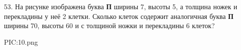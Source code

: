 53. На рисунке изображена буква {\bf П} ширины 7, высоты 5, а толщина ножек и перекладины у неё 2 клетки. Сколько клеток содержит аналогичная буква {\bf П} ширины 70, высоты 60 и с толщиной ножки и перекладины 6 клеток?
\begin{center}
{{PIC:10.png}}
\end{center}
